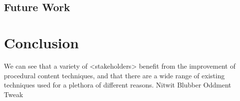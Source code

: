 \documentclass{acm_proc_article-sp}
\begin{document}
\subsection{Future Work}

\section{Conclusion}
We can see that a variety of <stakeholders> benefit from the improvement of procedural content techniques, and that there are a wide range of existing techniques used for a plethora of different reasons. Nitwit Blubber Oddment Tweak

\newpage


\balancecolumns
\end{document}
